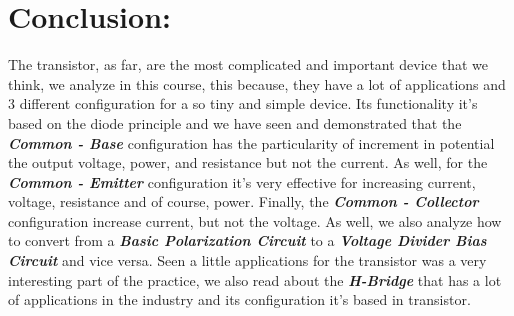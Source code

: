 \section{Conclusion:}

The transistor, as far, are the most complicated and important device that we think, we analyze in this course, this because, they have a lot of applications and 3 different configuration for a so tiny and simple device. Its functionality it's based on the diode principle and we have seen and demonstrated that the {\bfseries\itshape Common - Base} configuration has the particularity of increment in potential the output voltage, power, and resistance but not the current. As well, for the {\bfseries\itshape Common - Emitter} configuration it's very effective for increasing current, voltage, resistance and of course, power. Finally, the {\bfseries\itshape Common - Collector} configuration increase current, but not the voltage. As well, we also analyze how to convert from a {\bfseries\itshape Basic Polarization Circuit} to a {\bfseries\itshape Voltage Divider Bias Circuit} and vice versa. Seen a little applications for the transistor was a very interesting part of the practice, we also read about the {\bfseries\itshape H-Bridge} that has a lot of applications in the industry and its configuration it's based in transistor.

\pagebreak